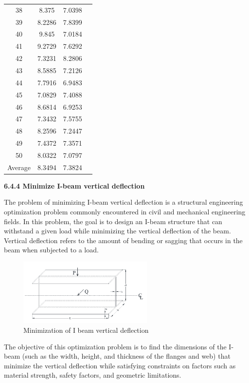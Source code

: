 \documentclass[
]{article}
\begin{document}
\begin{justify}
{\begin{table}[htbp]
\begin{tabular}{cccc}
38 & 8.375 & 7.0398 \\
39 & 8.2286 & 7.8399 \\
40 & 9.845 & 7.0184 \\
41 & 9.2729 & 7.6292 \\
42 & 7.3231 & 8.2806 \\
43 & 8.5885 & 7.2126 \\
44 & 7.7916 & 6.9483 \\
45 & 7.0829 & 7.4088 \\
46 & 8.6814 & 6.9253 \\
47 & 7.3432 & 7.5755 \\
48 & 8.2596 & 7.2447 \\
49 & 7.4372 & 7.3571 \\
50 & 8.0322 & 7.0797 \\
\midrule
Average & 8.3494 & 7.3824 \\
\bottomrule
\end{tabular}
\end{table}

\newpage
\def\labelenumi{\arabic{enumi}.}
\item
\vspace{5mm}
\textbf{6.4.4 Minimize I-beam vertical deflection}

The problem of minimizing I-beam vertical deflection is a structural engineering optimization problem commonly encountered in civil and mechanical engineering fields. In this problem, the goal is to design an I-beam structure that can withstand a given load while minimizing the vertical deflection of the beam. Vertical deflection refers to the amount of bending or sagging that occurs in the beam when subjected to a load.

\begin{figure}[htbp]
    \centering
    \includegraphics[width=0.6\textwidth]{beam.png}
    \caption{Minimization of I beam vertical deflection}
\end{figure}

The objective of this optimization problem is to find the dimensions of the I-beam (such as the width, height, and thickness of the flanges and web) that minimize the vertical deflection while satisfying constraints on factors such as material strength, safety factors, and geometric limitations.

}
\end{justify}
\end{document}
